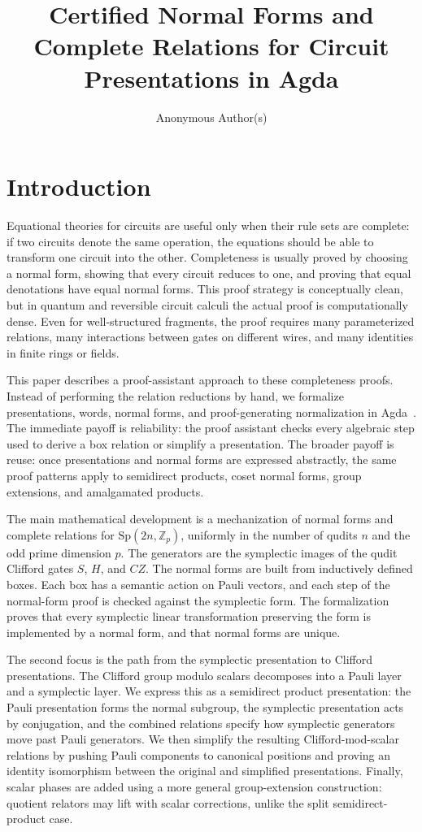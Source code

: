 \documentclass[acmsmall,screen,review,anonymous]{acmart}
\title{Certified Normal Forms and Complete Relations for Circuit Presentations in Agda}
\author{Anonymous Author(s)}
\affiliation{\institution{Anonymous Institution}}
\newcommand{\Agda}{Agda\xspace}
\newcommand{\Zp}{\mathbb{Z}_p}
\newcommand{\Sp}{\mathrm{Sp}}
\begin{document}
\maketitle

\section{Introduction}

Equational theories for circuits are useful only when their rule sets are
complete: if two circuits denote the same operation, the equations should be
able to transform one circuit into the other. Completeness is usually proved by
choosing a normal form, showing that every circuit reduces to one, and proving
that equal denotations have equal normal forms. This proof strategy is
conceptually clean, but in quantum and reversible circuit calculi the actual
proof is computationally dense. Even for well-structured fragments, the proof
requires many parameterized relations, many interactions between gates on
different wires, and many identities in finite rings or fields.

This paper describes a proof-assistant approach to these completeness proofs.
Instead of performing the relation reductions by hand, we formalize
presentations, words, normal forms, and proof-generating normalization in
\Agda~\cite{Agda}. The immediate payoff is reliability: the proof assistant
checks every algebraic step used to derive a box relation or simplify a
presentation. The broader payoff is reuse: once presentations and normal forms
are expressed abstractly, the same proof patterns apply to semidirect products,
coset normal forms, group extensions, and amalgamated products.

The main mathematical development is a mechanization of normal forms and
complete relations for \(\Sp(2n,\Zp)\), uniformly in the number of qudits \(n\)
and the odd prime dimension \(p\). The generators are the symplectic images of
the qudit Clifford gates \(S\), \(H\), and \(CZ\). The normal forms are built
from inductively defined boxes. Each box has a semantic action on Pauli vectors,
and each step of the normal-form proof is checked against the symplectic form.
The formalization proves that every symplectic linear transformation preserving
the form is implemented by a normal form, and that normal forms are unique.

The second focus is the path from the symplectic presentation to Clifford
presentations. The Clifford group modulo scalars decomposes into a Pauli layer
and a symplectic layer. We express this as a semidirect product presentation:
the Pauli presentation forms the normal subgroup, the symplectic presentation
acts by conjugation, and the combined relations specify how symplectic
generators move past Pauli generators. We then simplify the resulting
Clifford-mod-scalar relations by pushing Pauli components to canonical
positions and proving an identity isomorphism between the original and
simplified presentations. Finally, scalar phases are added using a more general
group-extension construction: quotient relators may lift with scalar
corrections, unlike the split semidirect-product case.
\end{document}
